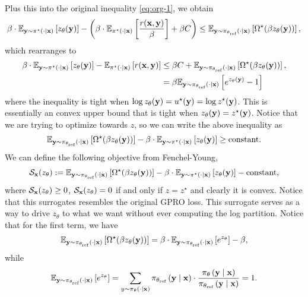 \documentclass[11pt]{article}  %
\begin{document}
Plus this into the original inequality \eqref{eq:org-1}, we obtain 
\begin{align*}
  \beta \cdot \mathbb{E}_{\mathbf{y} \sim \pi^\star(\cdot \mid \mathbf{x})}\left[z_{\theta}(\mathbf{y})\right] - \left( \beta\cdot \mathbb{E}_{\pi^\star(\cdot\mid \mathbf{x})}\left[\frac{r(\mathbf{x}, \mathbf{y})}{\beta}\right] + \beta C \right) \leq \mathbb{E}_{\mathbf{y} \sim \pi_{\theta_{\text{ref}}}\left( \cdot \mid \mathbf{x} \right)}\left[\Omega^\star(\beta z_{\theta}(\mathbf{y}))\right],
\end{align*} 
which rearranges to 
\begin{align*}
  \beta \cdot \mathbb{E}_{\mathbf{y} \sim \pi^\star(\cdot \mid \mathbf{x})}\left[z_{\theta}(\mathbf{y})\right] - \mathbb{E}_{\pi^\star(\cdot\mid \mathbf{x})}\left[{r(\mathbf{x}, \mathbf{y})}\right] &\leq \beta C + \mathbb{E}_{\mathbf{y} \sim \pi_{\theta_{\text{ref}}}\left( \cdot \mid \mathbf{x} \right)}\left[\Omega^\star(\beta z_{\theta}(\mathbf{y}))\right], \\
  &= \beta\mathbb{E}_{\mathbf{y} \sim \pi_{\theta_{\text{ref}}}\left( \cdot \mid \mathbf{x} \right)}\left[e^{z_{\theta}(\mathbf{y})} - 1\right]
\end{align*}
where the inequality is tight when $\log z_{\theta}(\mathbf{y}) = u^\star(\mathbf{y}) = \log z^\star(\mathbf{y})$. 
This is essentially an convex upper bound that is tight when $z_{\theta}(\mathbf{y}) = z^\star(\mathbf{y})$.
Notice that we are trying to optimize towards $z$, so we can write the above inequality as 
\begin{align*}
  \mathbb{E}_{\mathbf{y} \sim \pi_{\theta_{\text{ref}}}\left( \cdot \mid \mathbf{x} \right)}\left[\Omega^\star(\beta z_{\theta}(\mathbf{y}))\right] - \beta \cdot \mathbb{E}_{\mathbf{y} \sim \pi^\star(\cdot \mid \mathbf{x})}\left[z_{\theta}(\mathbf{y})\right] \geq \text{constant}.
\end{align*}
We can define the following objective from Fenchel-Young,
\begin{align*}
  \mathcal{S}_{\mathbf{x}}(z_\theta) := \mathbb{E}_{\mathbf{y} \sim \pi_{\theta_{\text{ref}}}\left( \cdot \mid \mathbf{x} \right)}\left[\Omega^\star(\beta z_{\theta}(\mathbf{y}))\right] - \beta \cdot \mathbb{E}_{\mathbf{y} \sim \pi^\star(\cdot \mid \mathbf{x})}\left[z_{\theta}(\mathbf{y})\right] - \text{constant},
\end{align*}
where $\mathcal{S}_{\mathbf{x}}(z_\theta) \geq 0$, $\mathcal{S}_{\mathbf{x}}(z_\theta) = 0$ if and only if $z = z^\star$ and clearly it is convex.
Notice that this surrogates resembles the original GPRO loss.
This surrogate serves as a way to drive $z_\theta$ to what we want without ever computing the log partition.
Notice that for the first term, we have 
\begin{align*}
  \mathbb{E}_{\mathbf{y} \sim \pi_{\theta_{\text{ref}}}\left( \cdot \mid \mathbf{x} \right)}\left[\Omega^\star(\beta z_{\theta}(\mathbf{y}))\right] = \beta \cdot \mathbb{E}_{\mathbf{y} \sim \pi_{\theta_{\text{ref}}}\left( \cdot \mid \mathbf{x} \right)}\left[e^{z_\theta}\right] - \beta,
\end{align*}
while 
\begin{align*}
  \mathbb{E}_{\mathbf{y} \sim \pi_{\theta_{\text{ref}}}\left( \cdot \mid \mathbf{x} \right)}\left[e^{z_\theta}\right] = \sum_{y \sim \pi_{\theta}\left( \cdot \mid \mathbf{x} \right)}\pi_{\theta_{\text{ref}}}\left( \mathbf{y} \mid \mathbf{x} \right)\cdot\frac{\pi_{\theta}\left( \mathbf{y} \mid \mathbf{x} \right)}{\pi_{\theta_{\text{ref}}}\left( \mathbf{y} \mid \mathbf{x} \right)} = 1.
\end{align*}
\end{document}
